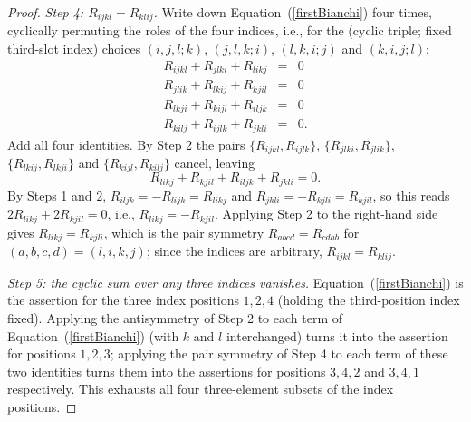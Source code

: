 \begin{proof}
\emph{Step 4: $R_{ijkl}=R_{klij}$.} Write down
Equation~(\ref{firstBianchi}) four times, cyclically permuting the
roles of the four indices, i.e., for the (cyclic triple; fixed
third-slot index) choices $(i,j,l;k)$, $(j,l,k;i)$, $(l,k,i;j)$ and
$(k,i,j;l)$:
\begin{eqnarray*}
R_{ijkl}+R_{jlki}+R_{likj} & = & 0\\
R_{jlik}+R_{lkij}+R_{kjil} & = & 0\\
R_{lkji}+R_{kijl}+R_{iljk} & = & 0\\
R_{kilj}+R_{ijlk}+R_{jkli} & = & 0.
\end{eqnarray*}
Add all four identities. By Step 2 the pairs
$\{R_{ijkl},R_{ijlk}\}$, $\{R_{jlki},R_{jlik}\}$,
$\{R_{lkij},R_{lkji}\}$ and $\{R_{kijl},R_{kilj}\}$ cancel, leaving
$$R_{likj}+R_{kjil}+R_{iljk}+R_{jkli}=0.$$
By Steps 1 and 2, $R_{iljk}=-R_{lijk}=R_{likj}$ and
$R_{jkli}=-R_{kjli}=R_{kjil}$, so this reads
$2R_{likj}+2R_{kjil}=0$, i.e., $R_{likj}=-R_{kjil}$. Applying Step 2
to the right-hand side gives $R_{likj}=R_{kjli}$, which is the pair
symmetry $R_{abcd}=R_{cdab}$ for $(a,b,c,d)=(l,i,k,j)$; since the
indices are arbitrary, $R_{ijkl}=R_{klij}$.

\emph{Step 5: the cyclic sum over any three indices vanishes.}
Equation~(\ref{firstBianchi}) is the assertion for the three index
positions $1,2,4$ (holding the third-position index fixed). Applying
the antisymmetry of Step 2 to each term of
Equation~(\ref{firstBianchi}) (with $k$ and $l$ interchanged)
turns it into the assertion for positions $1,2,3$; applying the pair
symmetry of Step 4 to each term of these two identities turns them
into the assertions for positions $3,4,2$ and $3,4,1$ respectively.
This exhausts all four three-element subsets of the index positions.


\end{proof}
